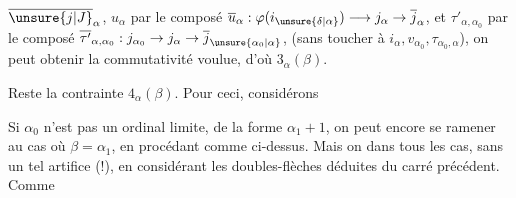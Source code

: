 
 $\overline{\unsure{j|J}}_\alpha$, $u_\alpha$ par le composé $\overline{u}_\alpha:\varphi(i_{\unsure{\delta|\alpha}})\longrightarrow j_\alpha\to\overline{j}_\alpha$, et $\tau'_{\alpha,\alpha_0}$ par le composé $\overline{\tau'}_{\alpha,\alpha_0}:j_{\alpha_0}\to j_\alpha\to\overline{j}_{\unsure{\alpha_0|\alpha}}$, (sans toucher à $i_\alpha,v_{\alpha_0},\tau_{\alpha_0,\alpha}$), on peut obtenir la commutativité voulue, d'où  $3_\alpha(\beta)$.

Reste la contrainte $4_\alpha(\beta)$. Pour ceci, considérons   

 Si $\alpha_0$ n'est pas un ordinal limite,  de la forme $\alpha_1+1$, on peut encore se ramener au cas où $\beta=\alpha_1$, en procédant comme ci-dessus. Mais on   dans tous les cas,  sans un tel artifice (!), en considérant les doubles-flèches
déduites du carré précédent. Comme 
